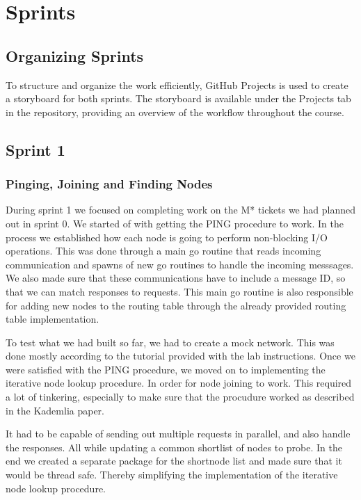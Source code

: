 \section{Sprints}

\subsection{Organizing Sprints}

To structure and organize the work efficiently, GitHub Projects is used to create a storyboard for both sprints. The storyboard is available under the 
Projects tab in the repository, providing an overview of the workflow throughout the course.

\subsection{Sprint 1}
\subsubsection{Pinging, Joining and Finding Nodes}
During sprint 1 we focused on completing work on the M* tickets we had planned out in sprint 0. We started of with getting the PING procedure to work. In the process we established how each node is going to perform non-blocking I/O operations. This was done through a main go routine that reads incoming communication and spawns of new go routines to handle the incoming messsages. We also made sure that these communications have to include a message ID, so that we can match responses to requests. This main go routine is also responsible for adding new nodes to the routing table through the already provided routing table implementation.

To test what we had built so far, we had to create a mock network. This was done mostly according to the tutorial provided with the lab instructions. Once we were satisfied with the PING procedure, we moved on to implementing the iterative node lookup procedure. In order for node joining to work. This required a lot of tinkering, especially to make sure that the procudure worked as described in the Kademlia paper.

It had to be capable of sending out multiple requests in parallel, and also handle the responses. All while updating a common shortlist of nodes to probe. In the end we created a separate package for the shortnode list and made sure that it would be thread safe. Thereby simplifying the implementation of the iterative node lookup procedure.


